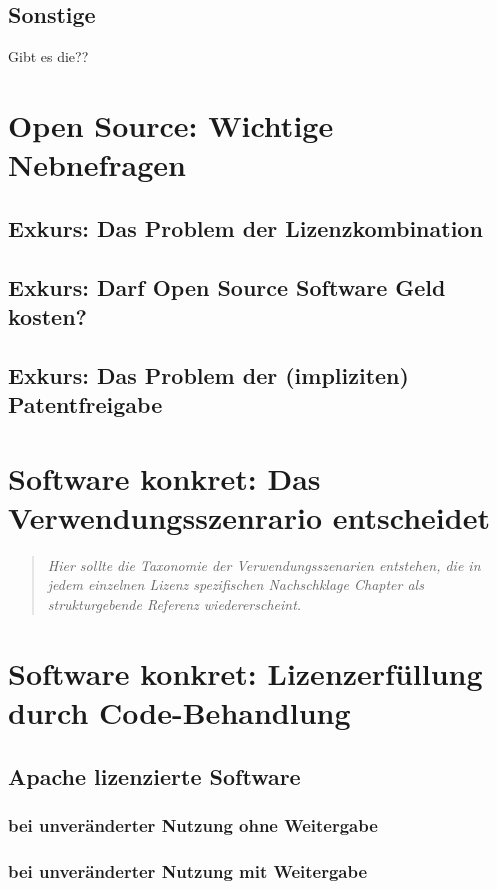 \documentclass[DIV=calc,BCOR=5mm,11pt,headings=small,oneside,toc=bib]{scrbook}
\begin{document}
\section{Sonstige}
Gibt es die??

\chapter{Open Source: Wichtige Nebnefragen}

\section{Exkurs: Das Problem der Lizenzkombination}

\section{Exkurs: Darf Open Source Software Geld kosten?}

\section{Exkurs: Das Problem der (impliziten) Patentfreigabe}

\chapter{Software konkret: Das Verwendungsszenrario entscheidet}
\begin{quote}\itshape
Hier sollte die Taxonomie der Verwendungsszenarien
entstehen, die in jedem einzelnen Lizenz spezifischen Nachschklage Chapter als strukturgebende Referenz
wiedererscheint.
\end{quote}

\chapter{Software konkret: Lizenzerfüllung durch Code-Behandlung}

\section{Apache lizenzierte Software}

\subsection{bei unveränderter Nutzung ohne Weitergabe}

\subsection{bei unveränderter Nutzung mit Weitergabe}
\end{document}
